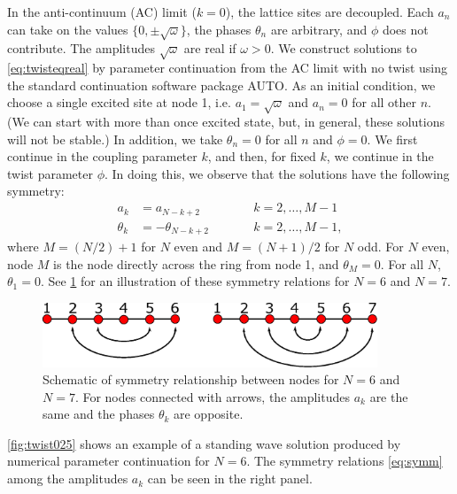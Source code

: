 \documentclass[12pt,reqno]{amsart}
\def\noi{\noindent}
\begin{document}
In the anti-continuum (AC) limit ($k = 0$), the lattice sites are decoupled. Each $a_n$ can take on the values $\{0, \pm \sqrt{\omega} \}$, the phases $\theta_n$ are arbitrary, and $\phi$ does not contribute. The amplitudes $\sqrt{\omega}$ are real if  $\omega > 0$. We construct solutions to \cref{eq:twisteqreal} by parameter continuation from the AC limit with no twist using the standard continuation software package AUTO. As an initial condition, we choose a single excited site at node 1, i.e. $a_1 = \sqrt{\omega}$ and $a_n = 0$ for all other $n$. (We can start with more than once excited state, but, in general, these solutions will not be stable.) In addition, we take $\theta_n = 0$ for all $n$ and $\phi = 0$.  We first continue in the coupling parameter $k$, and then, for fixed $k$, we continue in the twist parameter $\phi$. In doing this, we observe that the solutions have the following symmetry:
\begin{equation}\label{eq:symm}
\begin{aligned}
a_k &= a_{N-k+2} && \qquad k = 2, \dots, M-1 \\
\theta_k &= -\theta_{N-k+2} && \qquad k = 2, \dots, M-1,
\end{aligned}
\end{equation}
where $M = (N/2)+1$ for $N$ even and $M = (N+1)/2$ for $N$ odd. For $N$ even, node $M$ is the node directly across the ring from node 1, and $\theta_M = 0$. For all $N$, $\theta_1 = 0$. See \cref{fig:symmetry1} for an illustration of these symmetry relations for $N = 6$ and $N = 7$. 
\begin{figure}[H]
\begin{center}
\includegraphics[width=10cm]{symmetry1.eps}
\end{center}
\caption{Schematic of symmetry relationship between nodes for $N = 6$ and $N=7$. For nodes connected with arrows, the amplitudes $a_k$ are the same and the phases $\theta_k$ are opposite.}
\label{fig:symmetry1}
\end{figure}
\noi \cref{fig:twist025} shows an example of a standing wave solution produced by numerical parameter continuation for $N = 6$. The symmetry relations \cref{eq:symm} among the amplitudes $a_k$ can be seen in the right panel.
\end{document}
